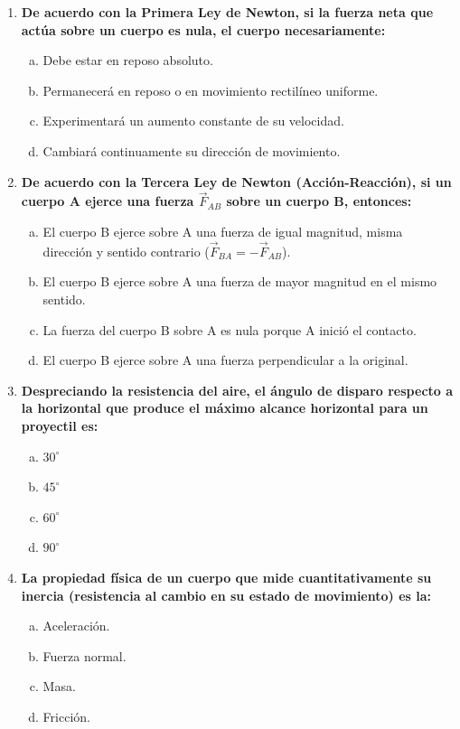 \documentclass[11pt,a4paper]{article}
\begin{document}
\begin{enumerate}
    \item \textbf{De acuerdo con la Primera Ley de Newton, si la fuerza neta que actúa sobre un cuerpo es nula, el cuerpo necesariamente:}
    \begin{enumerate}[a)]
        \item Debe estar en reposo absoluto.
        \item Permanecerá en reposo o en movimiento rectilíneo uniforme.
        \item Experimentará un aumento constante de su velocidad.
        \item Cambiará continuamente su dirección de movimiento.
    \end{enumerate}

    \item \textbf{De acuerdo con la Tercera Ley de Newton (Acción-Reacción), si un cuerpo A ejerce una fuerza $\vec{F}_{AB}$ sobre un cuerpo B, entonces:}
    \begin{enumerate}[a)]
        \item El cuerpo B ejerce sobre A una fuerza de igual magnitud, misma dirección y sentido contrario ($\vec{F}_{BA} = -\vec{F}_{AB}$).
        \item El cuerpo B ejerce sobre A una fuerza de mayor magnitud en el mismo sentido.
        \item La fuerza del cuerpo B sobre A es nula porque A inició el contacto.
        \item El cuerpo B ejerce sobre A una fuerza perpendicular a la original.
    \end{enumerate}

    \item \textbf{Despreciando la resistencia del aire, el ángulo de disparo respecto a la horizontal que produce el máximo alcance horizontal para un proyectil es:}
    \begin{enumerate}[a)]
        \item $30^\circ$
        \item $45^\circ$
        \item $60^\circ$
        \item $90^\circ$
    \end{enumerate}

    \item \textbf{La propiedad física de un cuerpo que mide cuantitativamente su inercia (resistencia al cambio en su estado de movimiento) es la:}
    \begin{enumerate}[a)]
        \item Aceleración.
        \item Fuerza normal.
        \item Masa.
        \item Fricción.
    \end{enumerate}


\end{enumerate}
\end{document}

